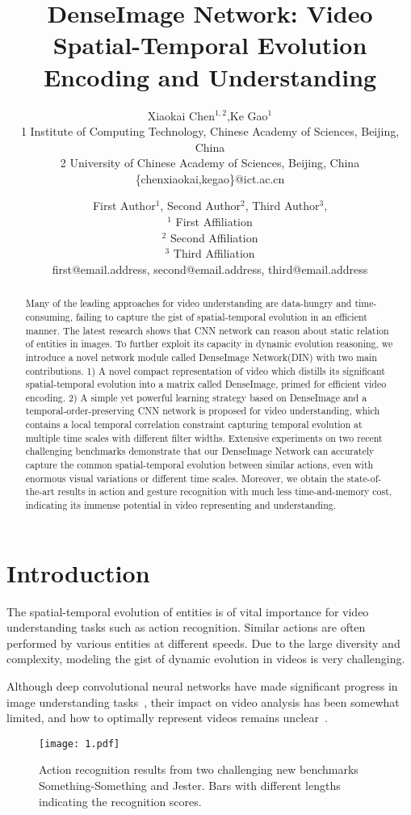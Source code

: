 \documentclass{article}
\title{DenseImage Network: Video Spatial-Temporal Evolution \\ Encoding and Understanding}
\author{Xiaokai Chen$^{1,2}$,Ke Gao$^{1}$\\
1 Institute of Computing Technology, Chinese Academy of Sciences, Beijing, China\\
2 University of Chinese Academy of Sciences, Beijing, China\\
\{chenxiaokai,kegao\}@ict.ac.cn}
\author{
First Author$^1$, 
Second Author$^2$, 
Third Author$^3$, 
\\ 
$^1$ First Affiliation \\
$^2$ Second Affiliation\\
$^3$ Third Affiliation  \\
first@email.address,
second@email.address,
third@email.address
}
\begin{document}
\maketitle

\begin{abstract}
Many of the leading approaches for video understanding are data-hungry and time-consuming, failing to capture the gist of spatial-temporal evolution in an efficient manner. The latest research shows that CNN network can reason about static relation of entities in images. To further exploit its capacity in dynamic evolution reasoning, we introduce a novel network module called DenseImage Network(DIN) with two main contributions. 1) A novel compact representation of video which distills its significant spatial-temporal evolution into a matrix called DenseImage, primed for efficient video encoding. 2) A simple yet powerful learning strategy based on DenseImage and a temporal-order-preserving CNN network is proposed for video understanding, which contains a local temporal correlation constraint capturing temporal evolution at multiple time scales with different filter widths. Extensive experiments on two recent challenging benchmarks demonstrate that our DenseImage Network can accurately capture the common spatial-temporal evolution between similar actions, even with enormous visual variations or different time scales. Moreover, we obtain the state-of-the-art results in action and gesture recognition with much less time-and-memory cost, indicating its immense potential in video representing and understanding.
\end{abstract}

\section{Introduction}
The spatial-temporal evolution of entities is of vital importance for video understanding tasks such as action recognition. Similar actions are often performed by various entities at different speeds. Due to the large diversity and complexity, modeling the gist of dynamic evolution in videos is very challenging.

Although deep convolutional neural networks have made significant progress in image understanding tasks~\cite{BadrinarayananK15,VinyalsTBE15}, their impact on video analysis has been somewhat limited, and how to optimally represent videos remains unclear~\cite{SigurdssonRG17}.
\begin{figure}
	\begin{center}
		\texttt{[image: 1.pdf]}
		\caption{Action recognition results from two challenging new benchmarks Something-Something and Jester. Bars with different lengths indicating the recognition scores.}
		\label{Figure 1.}
	\end{center}
	\vspace{-0.5em}
\end{figure}
\end{document}
